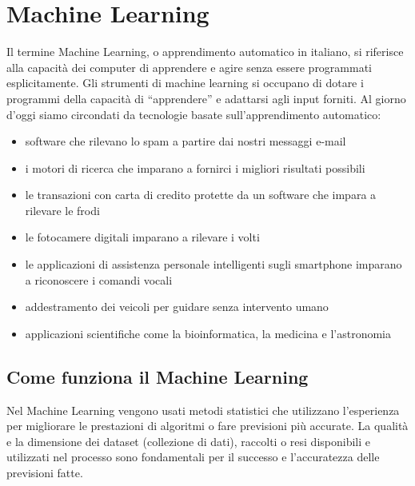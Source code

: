 \documentclass[12pt,italian]{report}
\begin{document}
\chapter{Machine Learning}
Il termine Machine Learning, o apprendimento automatico in italiano, si riferisce alla capacità dei computer di apprendere e agire senza essere programmati esplicitamente.
Gli strumenti di machine learning si occupano di dotare i programmi della capacità di ``apprendere'' e adattarsi agli input forniti.
Al giorno d'oggi siamo circondati da tecnologie basate sull'apprendimento automatico:
\begin{itemize}
	\item software che rilevano lo spam a partire dai nostri messaggi e-mail  
	\item i motori di ricerca che imparano a fornirci i migliori risultati possibili
	\item le transazioni con carta di credito protette da un software che impara a rilevare le frodi
	\item le fotocamere digitali imparano a rilevare i volti
	\item le applicazioni di assistenza personale intelligenti sugli smartphone imparano a riconoscere i comandi vocali
	\item addestramento dei veicoli per guidare senza intervento umano
	\item applicazioni scientifiche come la bioinformatica, la medicina e l'astronomia
\end{itemize}
\section{Come funziona il Machine Learning}
\label{sec:Come funziona il Machine Learning}
Nel Machine Learning vengono usati metodi statistici che utilizzano l'esperienza per migliorare le prestazioni di algoritmi o fare previsioni più accurate.
La qualità e la dimensione dei dataset (collezione di dati), raccolti o resi disponibili e utilizzati nel processo sono fondamentali per il successo e l'accuratezza delle previsioni fatte.
\end{document}
